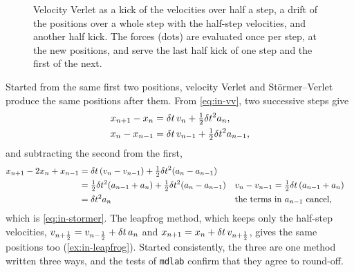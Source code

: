 \begin{figure}[htb]
\centering
{}
\caption{Velocity Verlet as a kick of the velocities over half a step, a
drift of the positions over a whole step with the half-step velocities,
and another half kick. The forces (dots) are evaluated once per step, at
the new positions, and serve the last half kick of one step and the first
of the next.}
\label{fig:in-kdk}
\end{figure}

Started from the same first two positions, velocity Verlet and
Störmer--Verlet produce the same positions after them. From
\cref{eq:in-vv}, two successive steps give
\begin{align*}
   x_{n+1} - x_n &= \delta t\,v_n + \tfrac12\delta t^2a_n ,\\
   x_n - x_{n-1} &= \delta t\,v_{n-1} + \tfrac12\delta t^2a_{n-1} ,
\end{align*}
and subtracting the second from the first,
\begin{align*}
   x_{n+1} - 2x_n + x_{n-1} &= \delta t\,(v_n - v_{n-1})
   + \tfrac12\delta t^2(a_n - a_{n-1})\\
   &= \tfrac12\delta t^2(a_{n-1} + a_n) + \tfrac12\delta t^2(a_n - a_{n-1})
   && \text{$v_n - v_{n-1} = \tfrac12\delta t\,(a_{n-1} + a_n)$}\\
   &= \delta t^2a_n && \text{the terms in $a_{n-1}$ cancel,}
\end{align*}
which is \cref{eq:in-stormer}. The leapfrog method, which keeps only the
half-step velocities, $v_{n+\frac12} = v_{n-\frac12} + \delta t\,a_n$ and $x_{n+1}
= x_n + \delta t\,v_{n+\frac12}$, gives the same positions too (\cref{ex:in-leapfrog}).
Started consistently, the three are one method written three ways, and
the tests of
\texttt{mdlab} confirm that they agree to round-off.


